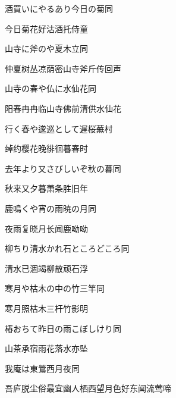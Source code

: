 \begin{haiku}
    {\FH 酒買いにやるあり今日の菊}\hfill{\FH 同}

    {\FK 今日菊花好沽酒托侍童}
\end{haiku}

\begin{haiku}
    {\FH 山寺に斧のや夏木立}\hfill{\FH 同}

    {\FK 仲夏树丛凉荫密山寺斧斤传回声}
\end{haiku}

\begin{haiku}
    {\FH 山寺の春や仏に水仙花}\hfill{\FH 同}

    {\FK 阳春冉冉临山寺佛前清供水仙花}
\end{haiku}

\begin{haiku}
    {\FH 行く春や逡巡として遅桜}\hfill{\FH 蕪村}

    {\FK 绰约樱花晚徘徊暮春时}
\end{haiku}

\begin{haiku}
    {\FH 去年より又さびしいぞ秋の暮}\hfill{\FH 同}

    {\FK 秋来又夕暮萧条胜旧年}
\end{haiku}

\begin{haiku}
    {\FH 鹿鳴くや宵の雨暁の月}\hfill{\FH 同}

    {\FK 夜雨复晓月长闻鹿呦呦}
\end{haiku}

\begin{haiku}
    {\FH 柳ちり清水かれ石ところどころ}\hfill{\FH 同}

    {\FK 清水已涸竭柳散顽石浮}
\end{haiku}

\begin{haiku}
    {\FH 寒月や枯木の中の竹三竿}\hfill{\FH 同}

    {\FK 寒月照枯木三杆竹影明}
\end{haiku}

\begin{haiku}
    {\FH 椿おちて昨日の雨こぼしけり}\hfill{\FH 同}

    {\FK 山茶承宿雨花落水亦坠}
\end{haiku}

\begin{haiku}
    {\FH 我庵は東鶯西月夜}\hfill{\FH 同}

    {\FK 吾庐脱尘俗最宜幽人栖西望月色好东闻流莺啼}
\end{haiku}

